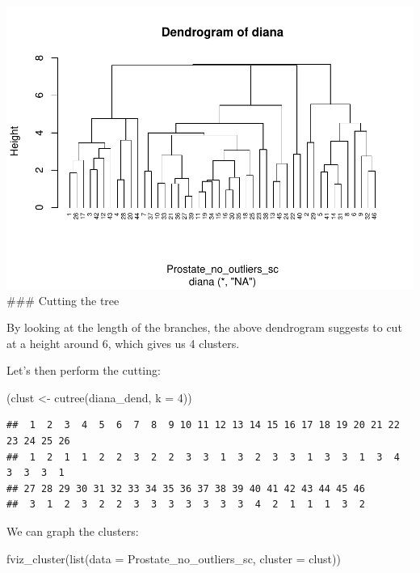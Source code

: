 \documentclass[
]{article}
\newenvironment{Shaded}{\begin{snugshade}}{\end{snugshade}}
\newcommand{\AttributeTok}[1]{\textcolor[rgb]{0.77,0.63,0.00}{#1}}
\newcommand{\DecValTok}[1]{\textcolor[rgb]{0.00,0.00,0.81}{#1}}
\newcommand{\FunctionTok}[1]{\textcolor[rgb]{0.00,0.00,0.00}{#1}}
\newcommand{\NormalTok}[1]{#1}
\newcommand{\OtherTok}[1]{\textcolor[rgb]{0.56,0.35,0.01}{#1}}
\begin{document}
\includegraphics{clustering_files/figure-latex/unnamed-chunk-39-1.pdf}
\#\#\# Cutting the tree

By looking at the length of the branches, the above dendrogram suggests
to cut at a height around 6, which gives us 4 clusters.

Let's then perform the cutting:

\begin{Shaded}
\begin{Highlighting}[]
\NormalTok{(clust }\OtherTok{\textless{}{-}} \FunctionTok{cutree}\NormalTok{(diana\_dend, }\AttributeTok{k =} \DecValTok{4}\NormalTok{)) }
\end{Highlighting}
\end{Shaded}

\begin{verbatim}
##  1  2  3  4  5  6  7  8  9 10 11 12 13 14 15 16 17 18 19 20 21 22 23 24 25 26 
##  1  2  1  1  2  2  3  2  2  3  3  1  3  2  3  3  1  3  3  1  3  4  3  3  3  1 
## 27 28 29 30 31 32 33 34 35 36 37 38 39 40 41 42 43 44 45 46 
##  3  1  2  3  2  2  3  3  3  3  3  3  3  4  2  1  1  1  3  2
\end{verbatim}

We can graph the clusters:

\begin{Shaded}
\begin{Highlighting}[]
\FunctionTok{fviz\_cluster}\NormalTok{(}\FunctionTok{list}\NormalTok{(}\AttributeTok{data =}\NormalTok{ Prostate\_no\_outliers\_sc, }\AttributeTok{cluster =}\NormalTok{ clust))}
\end{Highlighting}
\end{Shaded}
\end{document}
